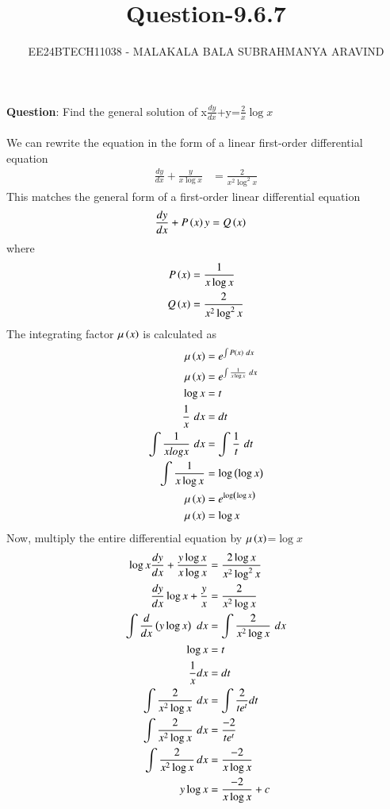 \documentclass[journal]{IEEEtran}
\numberwithin{equation}{enumi}
\numberwithin{figure}{enumi}
\begin{document}

\title{Question-9.6.7}
\author{EE24BTECH11038 - MALAKALA BALA SUBRAHMANYA ARAVIND}
{\let\newpage\relax\maketitle}
\textbf{Question}:
Find the general solution of x$\frac{dy}{dx}$+y=$\frac{2}{x}\log{x}$\\

\solution \\
We can rewrite the equation in the form of a linear first-order differential equation
\begin{align}
    \frac{dy}{dx}+\frac{y}{x\log{x}}&=\frac{2}{x^2{\log^2{x}}}
\end{align}
This matches the general form of a first-order linear differential equation
\begin{align}
    \frac{dy}{dx}+P\left(x\right)y&=Q\left(x\right)
\end{align}
where
\begin{align}
    P\left(x\right)&=\frac{1}{x\log{x}}\\
    Q\left(x\right)&=\frac{2}{x^2\log^2{x}}
\end{align}
The integrating factor $\mu \left(x\right)$ is calculated as
\begin{align}
    \mu \left(x\right)&=e^{\int P\left(x\right)\,\,dx}\\
    \mu \left(x\right)&=e^{\int \frac{1}{x\log{x}}\,\,dx}\\
    \log{x}&=t\\
    \frac{1}{x}\,\,dx&=dt\\
    \int \frac{1}{xlogx}\,\,dx&=\int \frac{1}{t}\,\,dt\\
    \int \frac{1}{x\log{x}}&=\log{\ensuremath{\left(\log{x}\right)}}\\
    \mu \left(x\right)&=e^{\log\left(\log{x}\right)}\\
    \mu \left(x\right)&=\log{x}
\end{align}
Now, multiply the entire differential equation by $\mu \left(x\right)$=$\log{x}$
\begin{align}
    \log{x}\frac{dy}{dx}+\frac{y\log{x}}{x\log{x}}&=\frac{2\log{x}}{x^2\log^2{x}}\\
    \frac{dy}{dx}\log{{x}}+\frac{y}{x}&=\frac{2}{x^2\log{x}}\\
    \int \frac{d}{dx}\left(y\log{x}\right)\,\, dx&=\int \frac{2}{x^2\log{x}}\,\,dx\\
    \log{x}&=t\\
    \frac{1}{x}dx&=dt\\
    \int \frac{2}{x^2\log{x}}\,\,dx&=\int \frac{2}{te^t}dt\\
     \int \frac{2}{x^2\log{x}}\,\,dx&= \frac{-2}{te^t}\\
    \int \frac{2}{x^2\log{x}}\,dx&=\frac{-2}{x\log{x}}\\
    y\log{x}&=\frac{-2}{x\log{x}}+c
\end{align}
\end{document}
